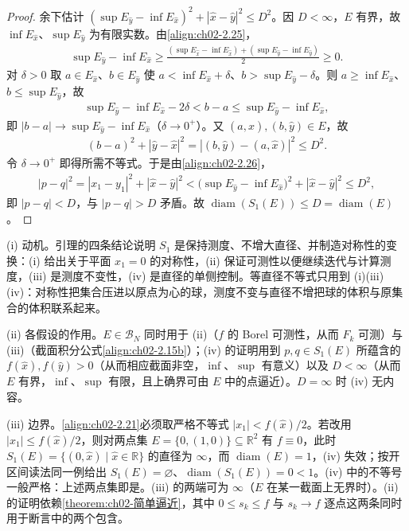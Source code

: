 \documentclass[../../main.tex]{subfiles}%
\begin{document}
\begin{proof}
余下估计 $(\sup E_{\hat y}-\inf E_{\hat x})^2+|\hat x-\hat y|^2\leqslant D^2$。因 $D<\infty$，$E$ 有界，故 $\inf E_{\hat x}$、$\sup E_{\hat y}$ 为有限实数。由\eqref{align:ch02-2.25}，
\begin{align*}
\sup E_{\hat y}-\inf E_{\hat x}\geqslant\frac{(\sup E_{\hat x}-\inf E_{\hat x})+(\sup E_{\hat y}-\inf E_{\hat y})}2\geqslant0.
\end{align*}
对 $\delta>0$ 取 $a\in E_{\hat x}$、$b\in E_{\hat y}$ 使 $a<\inf E_{\hat x}+\delta$、$b>\sup E_{\hat y}-\delta$。则 $a\geqslant\inf E_{\hat x}$、$b\leqslant\sup E_{\hat y}$，故
\begin{align*}
\sup E_{\hat y}-\inf E_{\hat x}-2\delta<b-a\leqslant\sup E_{\hat y}-\inf E_{\hat x},
\end{align*}
即 $|b-a|\to\sup E_{\hat y}-\inf E_{\hat x}$（$\delta\to0^+$）。又 $(a,\hat x),(b,\hat y)\in E$，故
\begin{align*}
(b-a)^2+|\hat y-\hat x|^2=|(b,\hat y)-(a,\hat x)|^2\leqslant D^2.
\end{align*}
令 $\delta\to0^+$ 即得所需不等式。于是由\eqref{align:ch02-2.26}，
\begin{align*}
|p-q|^2=|x_1-y_1|^2+|\hat x-\hat y|^2<\bigl(\sup E_{\hat y}-\inf E_{\hat x}\bigr)^2+|\hat x-\hat y|^2\leqslant D^2,
\end{align*}
即 $|p-q|<D$，与 $|p-q|>D$ 矛盾。故 $\operatorname{diam}(S_1(E))\leqslant D=\operatorname{diam}(E)$。
\end{proof}

\begin{remark}\label{remark:ch02-Steiner性质动机}
(i) 动机。引理的四条结论说明 $S_1$ 是保持测度、不增大直径、并制造对称性的变换：(i) 给出关于平面 $x_1=0$ 的对称性，(ii) 保证可测性以便继续迭代与计算测度，(iii) 是测度不变性，(iv) 是直径的单侧控制。等直径不等式只用到 (i)(iii)(iv)：对称性把集合压进以原点为心的球，测度不变与直径不增把球的体积与原集合的体积联系起来。

(ii) 各假设的作用。$E\in\mathscr B_N$ 同时用于 (ii)（$f$ 的 Borel 可测性，从而 $F_k$ 可测）与 (iii)（截面积分公式\eqref{align:ch02-2.15b}）；(iv) 的证明用到 $p,q\in S_1(E)$ 所蕴含的 $f(\hat x),f(\hat y)>0$（从而相应截面非空，$\inf$、$\sup$ 有意义）以及 $D<\infty$（从而 $E$ 有界，$\inf$、$\sup$ 有限，且上确界可由 $E$ 中的点逼近）。$D=\infty$ 时 (iv) 无内容。

(iii) 边界。\eqref{align:ch02-2.21}必须取严格不等式 $|x_1|<f(\hat x)/2$。若改用 $|x_1|\leqslant f(\hat x)/2$，则对两点集 $E=\{0,(1,0)\}\subseteq\mathbb R^2$ 有 $f\equiv0$，此时 $S_1(E)=\{(0,\hat x)\mid\hat x\in\mathbb R\}$ 的直径为 $\infty$，而 $\operatorname{diam}(E)=1$，(iv) 失效；按开区间读法同一例给出 $S_1(E)=\varnothing$、$\operatorname{diam}(S_1(E))=0<1$。(iv) 中的不等号一般严格：上述两点集即是。(iii) 的两端可为 $\infty$（$E$ 在某一截面上无界时）。(ii) 的证明依赖\cref{theorem:ch02-简单逼近}，其中 $0\leqslant s_k\leqslant f$ 与 $s_k\to f$ 逐点这两条同时用于断言中的两个包含。
\end{remark}
\end{document}
